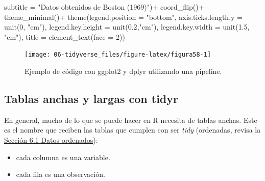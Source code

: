 \documentclass[
]{article}
\newenvironment{Shaded}{\begin{snugshade}}{\end{snugshade}}
\newcommand{\AttributeTok}[1]{\textcolor[rgb]{0.77,0.63,0.00}{#1}}
\newcommand{\DecValTok}[1]{\textcolor[rgb]{0.00,0.00,0.81}{#1}}
\newcommand{\FloatTok}[1]{\textcolor[rgb]{0.00,0.00,0.81}{#1}}
\newcommand{\FunctionTok}[1]{\textcolor[rgb]{0.00,0.00,0.00}{#1}}
\newcommand{\NormalTok}[1]{#1}
\newcommand{\SpecialCharTok}[1]{\textcolor[rgb]{0.00,0.00,0.00}{#1}}
\newcommand{\StringTok}[1]{\textcolor[rgb]{0.31,0.60,0.02}{#1}}
\providecommand{\tightlist}{%
  \setlength{\itemsep}{0pt}\setlength{\parskip}{0pt}}
\theoremstyle{definition}
\theoremstyle{definition}
\theoremstyle{definition}
\theoremstyle{definition}
\theoremstyle{remark}
\begin{document}
\begin{Shaded}
\begin{Highlighting}[]
       \AttributeTok{subtitle =} \StringTok{"Datos obtenidos de Boston (1969)"}\NormalTok{)}\SpecialCharTok{+}
  \FunctionTok{coord\_flip}\NormalTok{()}\SpecialCharTok{+} 
  \FunctionTok{theme\_minimal}\NormalTok{()}\SpecialCharTok{+}
  \FunctionTok{theme}\NormalTok{(}\AttributeTok{legend.position =} \StringTok{"bottom"}\NormalTok{, }
        \AttributeTok{axis.ticks.length.y =} \FunctionTok{unit}\NormalTok{(}\DecValTok{0}\NormalTok{, }\StringTok{"cm"}\NormalTok{),}
        \AttributeTok{legend.key.height =} \FunctionTok{unit}\NormalTok{(}\FloatTok{0.2}\NormalTok{,}\StringTok{"cm"}\NormalTok{),}
        \AttributeTok{legend.key.width =} \FunctionTok{unit}\NormalTok{(}\FloatTok{1.5}\NormalTok{, }\StringTok{"cm"}\NormalTok{),}
        \AttributeTok{title =} \FunctionTok{element\_text}\NormalTok{(}\AttributeTok{face =} \DecValTok{2}\NormalTok{))}
\end{Highlighting}
\end{Shaded}

\begin{figure}

{\centering \texttt{[image: 06-tidyverse\_files/figure-latex/figura58-1]} 

}

\caption{Ejemplo de código con ggplot2 y dplyr utilizando una pipeline.}\label{fig:figura58}
\end{figure}

\hypertarget{tablas-anchas-y-largas-con-tidyr}{%
\subsection{Tablas anchas y largas con tidyr}\label{tablas-anchas-y-largas-con-tidyr}}

En general, mucho de lo que se puede hacer en R necesita de tablas anchas. Este es el nombre que reciben las tablas que cumplen con ser \emph{tidy} (ordenadas, revisa la \protect\hyperlink{datosordenados}{Sección 6.1 Datos ordenados}):

\begin{itemize}
\tightlist
\item
  cada columna es una variable.
\item
  cada fila es una observación.
\end{itemize}
\end{document}

